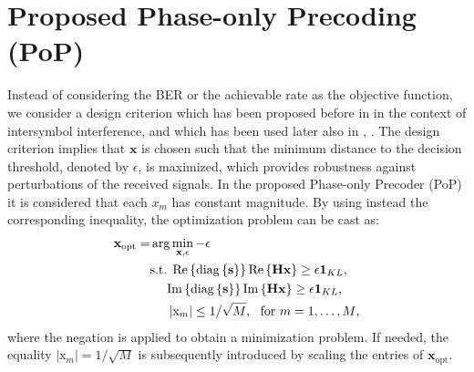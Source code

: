 \documentclass[journal,comsoc]{IEEEtran}
\begin{document}
  



\section{Proposed Phase-only Precoding (PoP)}
\label{sec:PoP}
Instead of considering the BER or the achievable rate as the objective function, we consider a design criterion which has been proposed before in \cite{Landau_SCC2013} in the context of intersymbol interference, and which has been used later also in \cite{Mo_2015}, \cite{Gokceoglu_2016b}.
The design criterion implies that $\mathbf{x}$ is chosen such that the minimum distance to the decision threshold, denoted by $\epsilon$, is maximized, which provides robustness against perturbations of the received signals. In the proposed Phase-only Precoder (PoP) it is considered that each $x_m$ has constant magnitude.
By using instead the corresponding inequality, the optimization problem can be cast as: 
\begin{align}
\label{eq:PoP}
\mathbf{x}_{\textrm{opt}} = &  \arg\min_{\mathbf{x}, \mathrm{\epsilon}}  -\mathrm{\epsilon} \\
& \textrm{s.t. }     \mathrm{Re} \left\{   \mathrm{diag} \left\{ \mathbf{s} \right\}  \right\}    \mathrm{Re} \left\{ \mathbf{H} \mathbf{x}  \right\}   \geq  \epsilon \boldsymbol{1}_{K L} \textrm{,} \notag \\
& \ \ \ \            \mathrm{Im} \left\{   \mathrm{diag} \left\{ \mathbf{s} \right\}  \right\}    \mathrm{Im} \left\{ \mathbf{H} \mathbf{x}  \right\}   \geq  \epsilon \boldsymbol{1}_{K L} \textrm{,} \notag \\
& \ \ \ \      \left|  \mathrm{x}_m \right| \leq   1/\sqrt{M}, \ \ \textrm{for } m=1,\ldots,M   \textrm{,}   \notag 
\end{align}
where the negation is applied to obtain a minimization problem.
If needed, the equality $\left|  \mathrm{x}_m \right| =   1/\sqrt{M}$ is subsequently introduced by scaling the entries of $\mathbf{x}_{\textrm{opt}}$.
\end{document}
